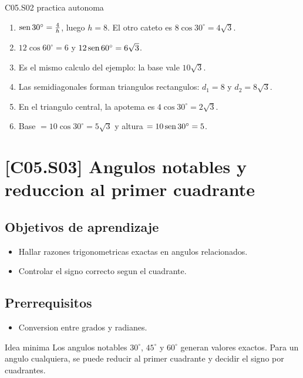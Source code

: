 \begin{fullsolution}{C05.S02 practica autonoma}
\begin{enumerate}[label=\textbf{PX-C05.S02-\arabic*:}, leftmargin=*]
  \item \(\operatorname{sen} 30^\circ=\frac{4}{h}\), luego \(h=8\). El otro cateto es \(8\cos 30^\circ=4\sqrt{3}\).
  \item \(12\cos 60^\circ=6\) y \(12\operatorname{sen} 60^\circ=6\sqrt{3}\).
  \item Es el mismo calculo del ejemplo: la base vale \(10\sqrt{3}\).
  \item Las semidiagonales forman triangulos rectangulos: \(d_1=8\) y \(d_2=8\sqrt{3}\).
  \item En el triangulo central, la apotema es \(4\cos 30^\circ=2\sqrt{3}\).
  \item Base \(=10\cos 30^\circ=5\sqrt{3}\) y altura \(=10\operatorname{sen} 30^\circ=5\).
\end{enumerate}
\end{fullsolution}

\section{[C05.S03] Angulos notables y reduccion al primer cuadrante}

\subsection*{Objetivos de aprendizaje}
\begin{itemize}
  \item Hallar razones trigonometricas exactas en angulos relacionados.
  \item Controlar el signo correcto segun el cuadrante.
\end{itemize}

\subsection*{Prerrequisitos}
\begin{itemize}
  \item Conversion entre grados y radianes.
\end{itemize}

\begin{theorybox}{Idea minima}
Los angulos notables \(30^\circ\), \(45^\circ\) y \(60^\circ\) generan valores exactos. Para un
angulo cualquiera, se puede reducir al primer cuadrante y decidir el signo por cuadrantes.

\begin{center}
\end{center}
\end{theorybox}

